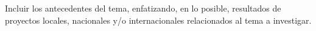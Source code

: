 Incluir los antecedentes del tema, enfatizando, en lo posible, resultados de proyectos locales, nacionales y/o internacionales relacionados al tema a investigar. 